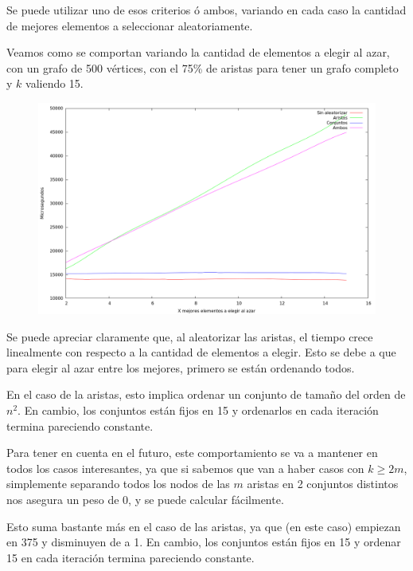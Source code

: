 Se puede utilizar uno de esos criterios ó ambos, variando en cada
caso la cantidad de mejores elementos a seleccionar aleatoriamente.

Veamos como se comportan variando la cantidad de elementos a elegir al azar,
con un grafo de 500 vértices, con el 75\% de aristas para tener un grafo
completo y $k$ valiendo 15.
\vspace*{0.5cm}

\begin{figure}[H]
  \begin{center}
    \includegraphics[scale=0.35]{imagenes/grasp-goloso-x-tiempo.png}
  \end{center}
\end{figure}

\vspace*{0.2cm}

Se puede apreciar claramente que, al aleatorizar las aristas, el tiempo crece
linealmente con respecto a la cantidad de elementos a elegir. Esto se debe
a que para elegir al azar entre los mejores, primero se están ordenando todos.

En el caso de la aristas, esto implica ordenar un conjunto de tamaño del orden
de $n^2$. En cambio, los conjuntos están fijos en 15 y ordenarlos en cada
iteración termina pareciendo constante.

Para tener en cuenta en el futuro, este comportamiento se va a mantener en
todos los casos interesantes, ya que si sabemos que van a haber casos con
$k \geq 2m$, simplemente separando todos los nodos de las $m$ aristas en 2
conjuntos distintos nos asegura un peso de 0, y se puede calcular fácilmente.

Esto suma bastante más en el caso de las aristas, ya que (en este caso)
empiezan en 375 y disminuyen de a 1. En cambio, los conjuntos están fijos en
15 y ordenar 15 en cada iteración termina pareciendo constante.

